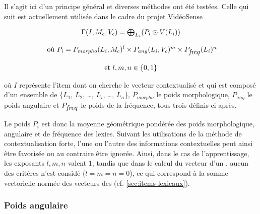 Il s'agit ici d'un principe général et diverses méthodes ont été
testées. Celle qui suit est actuellement utilisée dans le cadre du projet VidéoSense

  
\begin{equation}
  \begin{array}{c}
  \Gamma(I, M_{c}, V_{c}) = \bigoplus_{L_i}
  (P_i\odot V(L_i))\\\\
  \mbox{ où } P_i = P_{morpho}(L_i, M_c)^l \times P_{ang}(L_i,
    V_c)^m \times P_{\mbox{\emph{freq}}}(L_i)^n\\\\
    \mbox{et } l, m, n \in \{0,1\}
  \end{array}
\end{equation}

où $I$ représente l'item dont on cherche le vecteur contextualisé et
qui est composé d'un ensemble de  \{$L_1$, $L_2$,
\dots, $L_i$, \ldots, $L_n$\}, $P_{morpho}$ le poids morphologique,
$P_{ang}$ le poids angulaire et $P_{\mbox{\emph{freq}}}$ le poids de
la fréquence, tous trois définis ci-après.

Le poids $P_i$ est donc la moyenne géométrique pondérée des poids
morphologique, angulaire et de fréquence des lexies. Suivant les
utilisations de la méthode de contextualisation forte, l'une ou
l'autre des informations contextuelles peut ainsi être favorisée ou au
contraire être ignorée. Ainsi, dans le cas de l'apprentissage, les
exposants $l, m, n$ valent $1$, tandis que dans le calcul du vecteur
d'un , aucun des critères n'est considé
($l=m=n=0$), ce qui correspond à la somme vectorielle normée des
vecteurs des  (cf.  \ref{sec:items-lexicaux}).
  

\subsubsection{Poids angulaire}

